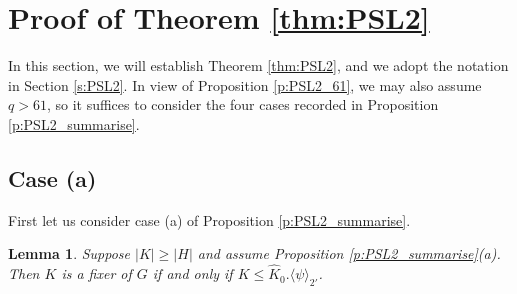 \documentclass[twoside,a4paper,reqno,11pt]{amsart}
\newcommand{\<}{\langle}
\renewcommand{\>}{\rangle}
\newcommand{\la}{\langle}
\newcommand{\ra}{\rangle}
\newcommand{\leqs}{\leqslant}
\newcommand{\geqs}{\geqslant}
\newtheorem{lem}[thm]{Lemma}
\theoremstyle{definition}
\begin{document}
	
	
	
	\section{Proof of Theorem \ref{thm:PSL2}}
	
	\label{s:thm1}
	
	In this section, we will establish Theorem \ref{thm:PSL2}, and we adopt the notation in Section \ref{s:PSL2}. In view of Proposition \ref{p:PSL2_61}, we may also assume $q > 61$, so it suffices to consider the four cases recorded in Proposition \ref{p:PSL2_summarise}.
	
	
	
	
	
	
	\subsection{Case (a)}
	
	First let us consider case (a) of Proposition \ref{p:PSL2_summarise}.
	
	\begin{lem}
		\label{l:PSL2_(a)}
		Suppose $|K|\geqs |H|$ and assume Proposition \ref{p:PSL2_summarise}(a). Then $K$ is a fixer of $G$ if and only if $K\leqs\widehat{K}_0.\la\psi\ra_{2'}$.
	\end{lem}
	
\end{document}
